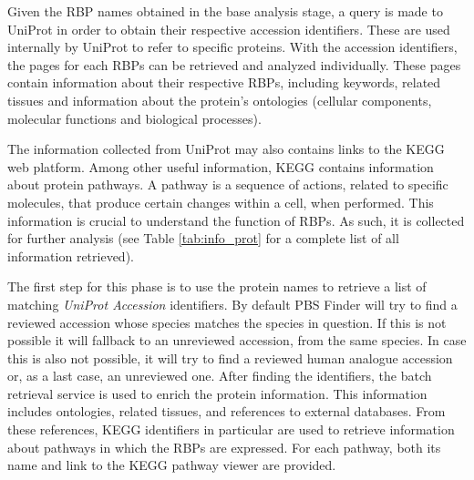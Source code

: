 Given the RBP names obtained in the base analysis stage, a query is made to
UniProt in order to obtain their respective accession identifiers. These are
used internally by UniProt to refer to specific proteins. With the accession
identifiers, the pages for each RBPs can be retrieved and analyzed individually.
These pages contain information about their respective RBPs, including keywords,
related tissues and information about the protein's ontologies (cellular
components, molecular functions and biological processes).

The information collected from UniProt may also contains links to the KEGG web
platform. Among other useful information, KEGG contains information about
protein pathways. A pathway is a sequence of actions, related to specific
molecules, that produce certain changes within a cell, when performed. This
information is crucial to understand the function of RBPs. As such, it is
collected for further analysis (see Table \ref{tab:info_prot} for a complete
list of all information retrieved).

The first step for this phase is to use the protein names to retrieve a list of
matching \emph{UniProt Accession} identifiers. By default PBS Finder will try to
find a reviewed accession whose species matches the species in question. If this
is not possible it will fallback to an unreviewed accession, from the same
species. In case this is also not possible, it will try to find a reviewed human
analogue accession or, as a last case, an unreviewed one. After finding the
identifiers, the batch retrieval service is used to enrich the protein
information. This information includes ontologies, related tissues, and
references to external databases. From these references, KEGG identifiers in
particular are used to retrieve information about pathways in which the RBPs are
expressed. For each pathway, both its name and link to the KEGG pathway viewer
are provided.

